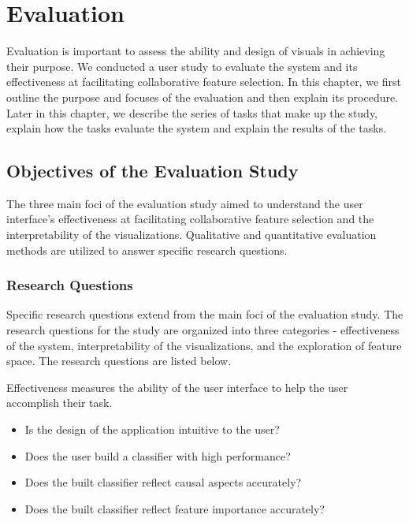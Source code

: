 \chapter{Evaluation}
Evaluation is important to assess the ability and design of visuals in achieving their purpose. We conducted a user study to evaluate the system and its effectiveness at facilitating collaborative feature selection. In this chapter, we first outline the purpose and focuses of the evaluation and then explain its procedure. Later in this chapter, we describe the series of tasks that make up the study, explain how the tasks evaluate the system and explain the results of the tasks.

\section{ Objectives of the Evaluation Study }
The three main foci of the evaluation study aimed to understand the user interface's effectiveness at facilitating collaborative feature selection and the interpretability of the visualizations. Qualitative and quantitative evaluation methods are utilized to answer specific research questions.

\subsection{Research Questions}
Specific research questions extend from the main foci of the evaluation study. The research questions for the study are organized into three categories - effectiveness of the system, interpretability of the visualizations, and the exploration of feature space. The research questions are listed below.

Effectiveness measures the ability of the user interface to help the user accomplish their task.
\begin{itemize}
\item{Is the design of the application intuitive to the user?}
\item{Does the user build a classifier with high performance?}
\item{Does the built classifier reflect causal aspects accurately?}
\item{Does the built classifier reflect feature importance accurately?}
\end{itemize}

